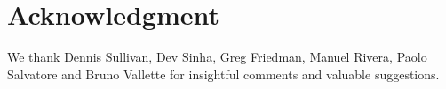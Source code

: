 
\section*{Acknowledgment}

We thank Dennis Sullivan, Dev Sinha, Greg Friedman, Manuel Rivera, Paolo Salvatore and Bruno Vallette for insightful comments and valuable suggestions.

